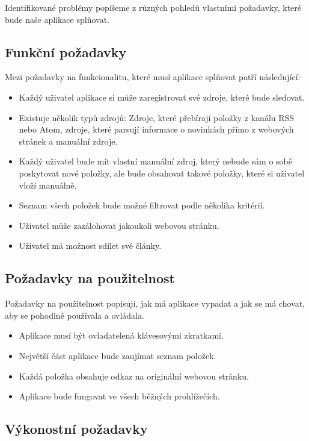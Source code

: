 Identifikované problémy popíšeme z různých pohledů vlastními požadavky, které bude naše aplikace splňovat.

\subsection{Funkční požadavky}

Mezi požadavky na funkcionalitu, které musí aplikace splňovat patří následující:

\begin{itemize}
    \item Každý uživatel aplikace si může zaregistrovat své zdroje, které bude sledovat.
    \item Existuje několik typů zdrojů: Zdroje, které přebírají položky z kanálu RSS nebo Atom, zdroje, které parsují informace o novinkách přímo z webových stránek a manuální zdroje.
    \item Každý uživatel bude mít vlastní manuální zdroj, který nebude sám o sobě poskytovat nové položky, ale bude obsahovat takové položky, které si uživatel vloží manuálně.
    \item Seznam všech položek bude možné filtrovat podle několika kritérií.
	\item Uživatel může zazálohovat jakoukoli webovou stránku.
	\item Uživatel má možnost sdílet své články.
\end{itemize}

\subsection{Požadavky na použitelnost}

Požadavky na použitelnost popisují, jak má aplikace vypadat a jak se má chovat, aby se pohodlně používala a ovládala.

\begin{itemize}
    \item Aplikace musí být ovladatelená klávesovými zkratkami.
    \item Největší část aplikace bude zaujímat seznam položek.
    \item Každá položka obsahuje odkaz na originální webovou stránku.
    \item Aplikace bude fungovat ve všech běžných prohlížečích.
\end{itemize}

\subsection{Výkonostní požadavky}

